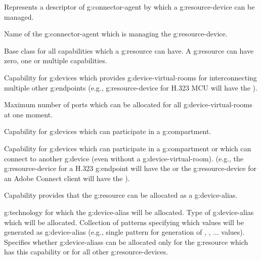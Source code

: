 \begin{Api}
Represents a descriptor of \gls{g:connector-agent} by which a \gls{g:resource-device} can be managed.
\begin{ApiClassAttributes}
 Name of the \gls{g:connector-agent} which is managing the \gls{g:resource-device}.
\end{ApiClassAttributes}

Base class for all capabilities which a \gls{g:resource} can have. A \gls{g:resource} can have zero, one or multiple capabilities.

 Capability for \glspl{g:device} which provides \glspl{g:device-virtual-room} for interconnecting multiple other \glspl{g:endpoint} (e.g., \gls{g:resource-device} for H.323 MCU will have the ).
\begin{ApiClassAttributes}
 Maximum number of ports which can be allocated for all \glspl{g:device-virtual-room} at one moment.
\end{ApiClassAttributes}

 Capability for \glspl{g:device} which can participate in a \gls{g:compartment}.

 Capability for \glspl{g:device} which can participate in a \gls{g:compartment} or which can connect to another \gls{g:device} (even without a \gls{g:device-virtual-room}).
(e.g., the \gls{g:resource-device} for a H.323 \gls{g:endpoint} will have the  or the \gls{g:resource-device} for an Adobe Connect client will have the ).

 Capability provides that the \gls{g:resource} can be allocated as a \gls{g:device-alias}.
\begin{ApiClassAttributes}
 \Gls{g:technology} for which the \gls{g:device-alias} will be allocated.
 Type of \gls{g:device-alias} which will be allocated.
 Collection of patterns specifying which values will be generated as \gls{g:device-alias} (e.g., single  pattern for generation of , , ...  values). 
 Specifies whether \glspl{g:device-alias} can be allocated only for the \gls{g:resource} which has this capability or for all other \glspl{g:resource-device}.
\end{ApiClassAttributes}


\end{Api}
